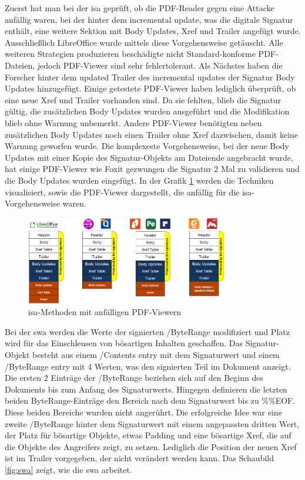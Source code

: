 Zuerst hat man bei der \gls{isa} geprüft, ob die PDF-Reader gegen eine Attacke anfällig waren, bei der hinter dem incremental update, was die digitale Signatur enthält, eine weitere Sektion mit Body Updates, Xref und Trailer angefügt wurde. Ausschließlich LibreOffice wurde mittels diese Vorgehensweise getäuscht. Alle weiteren Strategien produzieren beschädigte nicht Standard-konforme PDF-Dateien, jedoch PDF-Viewer sind sehr fehlertolerant. Als Nächstes haben die Forscher hinter dem updated Trailer des incremental updates der Signatur Body Updates hinzugefügt. Einige getestete PDF-Viewer haben lediglich überprüft, ob eine neue Xref und Trailer vorhanden sind. Da sie fehlten, blieb die Signatur gültig, die zusätzlichen Body Updates wurden ausgeführt und die Modifikation blieb ohne Warnung unbemerkt. Andere PDF-Viewer benötigten neben zusätzlichen Body Updates noch einen Trailer ohne Xref dazwischen, damit keine Warnung geworfen wurde. Die komplexeste Vorgehensweise, bei der neue Body Updates mit einer Kopie des Signatur-Objekts am Dateiende angebracht wurde, hat einige PDF-Viewer wie Foxit gezwungen die Signatur 2 Mal zu validieren und die Body Updates wurden eingefügt. In der Grafik \ref{fig:isa} werden die Techniken visualisiert, sowie die PDF-Viewer dargestellt, die anfällig für die \gls{isa}-Vorgehensweise waren.
\par

\begin{figure}[!htb]
	\centering
	\includegraphics[width=0.8\textwidth]{"images/isa.png"}
	\caption{\gls{isa}-Methoden mit anfälligen PDF-Viewern \cite{ccc-break-pdf-slides}}
	\label{fig:isa}
\end{figure}

Bei der \gls{swa} werden die Werte der signierten /ByteRange modifiziert und Platz wird für das Einschleusen von bösartigen Inhalten geschaffen. Das Signatur-Objekt besteht aus einem /Contents entry mit dem Signaturwert und einem /ByteRange entry mit 4 Werten, was den signierten Teil im Dokument anzeigt. Die ersten 2 Einträge der /ByteRange beziehen sich auf den Beginn des Dokuments bis zum Anfang des Signaturwerts. Hingegen definieren die letzten beiden ByteRange-Einträge den Bereich nach dem Signaturwert bis zu \%\%EOF. Diese beiden Bereiche wurden nicht angerührt. Die erfolgreiche Idee war eine zweite /ByteRange hinter dem Signaturwert mit einem angepassten dritten Wert, der Platz für bösartige Objekte, etwas Padding und eine bösartige Xref, die auf die Objekte des Angreifers zeigt, zu setzen. Lediglich die Position der neuen Xref ist im Trailer vorgegeben, der nicht verändert werden kann. Das Schaubild \ref{fig:swa} zeigt, wie die \gls{swa} arbeitet.
\par

